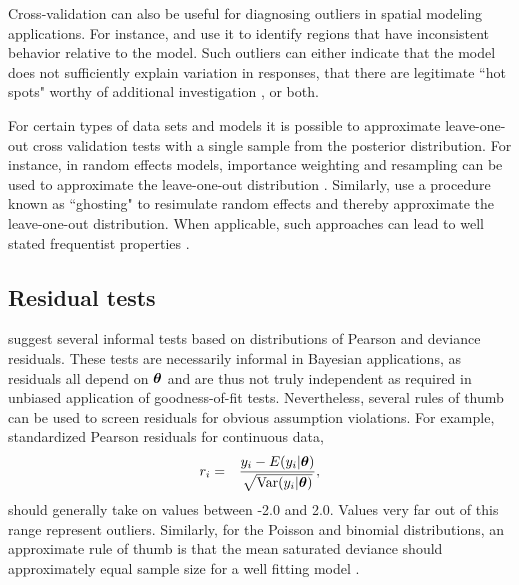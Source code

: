 \documentclass[12pt,english]{article}
\begin{document}
\begin{spacing}{1.9}
Cross-validation can also be useful for diagnosing outliers in spatial modeling applications.  For instance, \citet{SternCressie2000} and \citet{MarshallSpiegelhalter2003} use it to identify regions that have inconsistent behavior relative to the model.  Such outliers can either indicate that the model does not sufficiently explain variation in responses, that there are legitimate ``hot spots" worthy of additional investigation \citep{MarshallSpiegelhalter2003}, or both.

For certain types of data sets and models it is possible to approximate leave-one-out cross validation tests with a single sample from the posterior distribution.  For instance, in random effects models, importance weighting and resampling can be used to approximate the leave-one-out distribution \citep{SternCressie2000,QiuEtAl2016}. Similarly, \citet{MarshallSpiegelhalter2007} use a procedure known as ``ghosting" to resimulate random effects and thereby approximate the leave-one-out distribution.  When applicable, such approaches can lead to well stated frequentist properties \citep[i.e., a uniform distribution of p-values under the null;][]{QiuEtAl2016}.

\subsection{Residual tests}

\citet{LunnEtAl2013} suggest several informal tests based on distributions of Pearson and deviance residuals.  These tests are necessarily informal in Bayesian applications, as residuals all depend on $\boldsymbol{\theta}$ and are thus not truly independent as required in unbiased application of goodness-of-fit tests.  Nevertheless, several rules of thumb can be used to screen residuals for obvious assumption violations.  For example, standardized Pearson residuals for continuous data,
\begin{eqnarray*}
  r_i & = & \frac{y_i - E(y_i|\boldsymbol{\theta})}{\sqrt{\textrm{Var}(y_i | \boldsymbol{\theta})}},
\end{eqnarray*}
should generally take on values between -2.0 and 2.0.  Values very far out of this range represent outliers.
Similarly, for the Poisson and binomial distributions, an approximate rule of thumb is that the mean saturated deviance should approximately equal sample size for a well fitting model \citep{LunnEtAl2013}.


\end{spacing}
\end{document}

